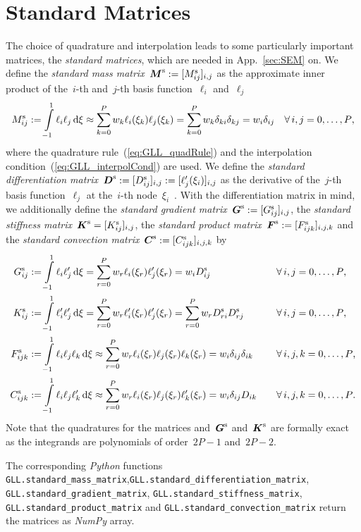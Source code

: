\documentclass[10pt, ngerman, english,
twoside, open=right,
numbers=noenddot,
declaration=section,
abstract=section,
abstract=multiple,
abstract=notoc,
declaration=notoc,
cd=pale, 
chapterprefix=off, 
chapterpage=false, 
headingsvskip=-10em,
cdgeometry=custom, 
slantedgreek=on,
cdmath=on, 
cdfont=on,
ttfont=false,
mathswap=off,
]{tudscrreprt}
\numberwithin{equation}{chapter}
\newcommand{\sidenote}[1]{
  \leavevmode %
  \marginpar{\hyphenpenalty=1000 \flushleft{\textcolor{HKS41}{#1}}}}
\begin{document}
\section{Standard Matrices}
\sidenote{Standard Matrices}The choice of quadrature and interpolation leads to some particularly important matrices, the \textit{standard matrices}, which are needed in App.~\ref{sec:SEM} on. We define the \textit{standard mass matrix}~$\mat M^\text{s} := [M^\text{s}_{ij}]_{i,j}$ as the approximate inner product of the~$i$-th and~$j$-th basis function~$\ell_i$ and~$\ell_j$
\begin{equation}
M^\text{s}_{ij} := \bint{\ell_i \ell_j}{\xi}{-1}{1} \approx \sum_{k=0}^P w_k\ell_i(\xi_k)\ell_j(\xi_k) = \sum_{k=0}^P w_k\delta_{ki}\delta_{kj} = w_i\delta_{ij}\quad \forall\, i,j=0,\ldots,P \text{,}
\end{equation}
where the quadrature rule~(\ref{eq:GLL_quadRule}) and the interpolation condition~(\ref{eq:GLL_interpolCond}) are used.
We define the \textit{standard differentiation matrix}~$\mat D^\text{s} := [D^\text{s}_{ij}]_{i,j} := [\ell'_j(\xi_i)]_{i,j}$ as the derivative of the~$j$-th basis function~$\ell_j$ at the~$i$-th node~$\xi_i$~\cite[see][Eq.~B.3.51]{DevilleFischer}.
With the differentiation matrix in mind, we additionally define the \textit{standard gradient matrix}~$\mat G^\text{s} := [G^\text{s}_{ij}]_{i,j}$, the \textit{standard stiffness matrix}~$\mat K^\text{s} = [K^\text{s}_{ij}]_{i,j}$, the \textit{standard product matrix}~$\mat F^\text{s} := [F^\text{s}_{ijk}]_{i,j,k}$ and the \textit{standard convection matrix}~$\mat C^\text{s} := [C^\text{s}_{ijk}]_{i,j,k}$ by
\begin{alignat}{2}
G^\text{s}_{ij} &:= \bint{\ell_i \ell'_j}{\xi}{-1}{1} = \sum_{r=0}^P w_r \ell_i(\xi_r) \ell'_j(\xi_r) = w_i D^\text{s}_{ij} &&\quad \forall\, i,j=0,\ldots,P \text{,}\\
K^\text{s}_{ij} &:= \bint{\ell'_i \ell'_j}{\xi}{-1}{1} = \sum_{r=0}^P w_r \ell'_i(\xi_r) \ell'_j(\xi_r) = \sum_{r=0}^P w_r D^\text{s}_{ri} D^\text{s}_{rj}&&\quad \forall\, i,j=0,\ldots,P \text{,}\\
F^\text{s}_{ijk} &:= \bint{\ell_i \ell_j \ell_k}{\xi}{-1}{1} \approx \sum_{r=0}^P w_r \ell_i(\xi_r) \ell_j(\xi_r) \ell_k(\xi_r) =  w_i \delta_{ij} \delta_{ik}&&\quad \forall\, i,j,k=0,\ldots,P \text{,}\\
C^\text{s}_{ijk} &:= \bint{\ell_i \ell_j \ell'_k}{\xi}{-1}{1} \approx \sum_{r=0}^P w_r \ell_i(\xi_r) \ell_j(\xi_r) \ell'_k(\xi_r) =  w_i \delta_{ij} D_{ik}&&\quad \forall\, i,j,k=0,\ldots,P \text{.}
\end{alignat}
Note that the quadratures for the matrices and~$\mat G^\text{s}$ and~$\mat K^\text{s}$ are formally exact as the integrands are polynomials of order~$2P-1$ and~$2P-2$.\par
\sidenote{\textit{Python} Functions}The corresponding \textit{Python} functions \texttt{GLL.standard\_mass\_matrix},\linebreak \texttt{GLL.standard\_differentiation\_matrix}, \texttt{GLL.standard\_gradient\_matrix}, \texttt{GLL.standard\_stiffness\_matrix}, \texttt{GLL.standard\_product\_matrix} and \texttt{GLL.standard\_convection\_matrix} return the matrices as \textit{NumPy} array.
\end{document}
